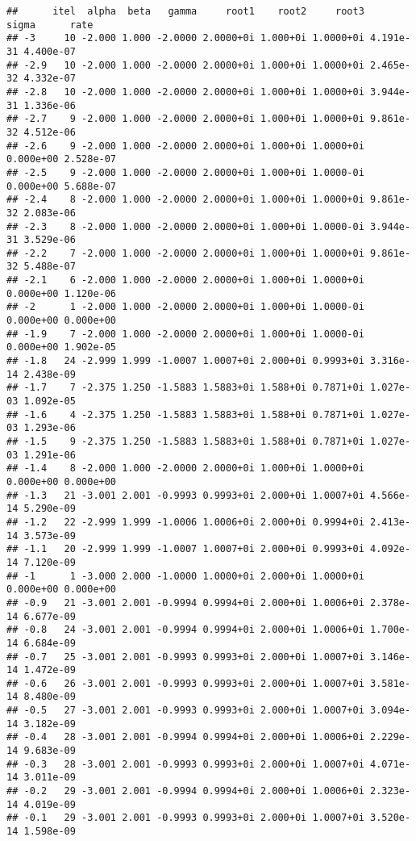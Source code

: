 \documentclass[
  12pt,
]{article}
\begin{document}
\begin{verbatim}
##      itel  alpha  beta   gamma     root1    root2     root3     sigma      rate
## -3     10 -2.000 1.000 -2.0000 2.0000+0i 1.000+0i 1.0000+0i 4.191e-31 4.400e-07
## -2.9   10 -2.000 1.000 -2.0000 2.0000+0i 1.000+0i 1.0000+0i 2.465e-32 4.332e-07
## -2.8   10 -2.000 1.000 -2.0000 2.0000+0i 1.000+0i 1.0000+0i 3.944e-31 1.336e-06
## -2.7    9 -2.000 1.000 -2.0000 2.0000+0i 1.000+0i 1.0000+0i 9.861e-32 4.512e-06
## -2.6    9 -2.000 1.000 -2.0000 2.0000+0i 1.000+0i 1.0000+0i 0.000e+00 2.528e-07
## -2.5    9 -2.000 1.000 -2.0000 2.0000+0i 1.000+0i 1.0000-0i 0.000e+00 5.688e-07
## -2.4    8 -2.000 1.000 -2.0000 2.0000+0i 1.000+0i 1.0000+0i 9.861e-32 2.083e-06
## -2.3    8 -2.000 1.000 -2.0000 2.0000+0i 1.000+0i 1.0000-0i 3.944e-31 3.529e-06
## -2.2    7 -2.000 1.000 -2.0000 2.0000+0i 1.000+0i 1.0000+0i 9.861e-32 5.488e-07
## -2.1    6 -2.000 1.000 -2.0000 2.0000+0i 1.000+0i 1.0000+0i 0.000e+00 1.120e-06
## -2      1 -2.000 1.000 -2.0000 2.0000+0i 1.000+0i 1.0000-0i 0.000e+00 0.000e+00
## -1.9    7 -2.000 1.000 -2.0000 2.0000+0i 1.000+0i 1.0000-0i 0.000e+00 1.902e-05
## -1.8   24 -2.999 1.999 -1.0007 1.0007+0i 2.000+0i 0.9993+0i 3.316e-14 2.438e-09
## -1.7    7 -2.375 1.250 -1.5883 1.5883+0i 1.588+0i 0.7871+0i 1.027e-03 1.092e-05
## -1.6    4 -2.375 1.250 -1.5883 1.5883+0i 1.588+0i 0.7871+0i 1.027e-03 1.293e-06
## -1.5    9 -2.375 1.250 -1.5883 1.5883+0i 1.588+0i 0.7871+0i 1.027e-03 1.291e-06
## -1.4    8 -2.000 1.000 -2.0000 2.0000+0i 1.000+0i 1.0000+0i 0.000e+00 0.000e+00
## -1.3   21 -3.001 2.001 -0.9993 0.9993+0i 2.000+0i 1.0007+0i 4.566e-14 5.290e-09
## -1.2   22 -2.999 1.999 -1.0006 1.0006+0i 2.000+0i 0.9994+0i 2.413e-14 3.573e-09
## -1.1   20 -2.999 1.999 -1.0007 1.0007+0i 2.000+0i 0.9993+0i 4.092e-14 7.120e-09
## -1      1 -3.000 2.000 -1.0000 1.0000+0i 2.000+0i 1.0000+0i 0.000e+00 0.000e+00
## -0.9   21 -3.001 2.001 -0.9994 0.9994+0i 2.000+0i 1.0006+0i 2.378e-14 6.677e-09
## -0.8   24 -3.001 2.001 -0.9994 0.9994+0i 2.000+0i 1.0006+0i 1.700e-14 6.684e-09
## -0.7   25 -3.001 2.001 -0.9993 0.9993+0i 2.000+0i 1.0007+0i 3.146e-14 1.472e-09
## -0.6   26 -3.001 2.001 -0.9993 0.9993+0i 2.000+0i 1.0007+0i 3.581e-14 8.480e-09
## -0.5   27 -3.001 2.001 -0.9993 0.9993+0i 2.000+0i 1.0007+0i 3.094e-14 3.182e-09
## -0.4   28 -3.001 2.001 -0.9994 0.9994+0i 2.000+0i 1.0006+0i 2.229e-14 9.683e-09
## -0.3   28 -3.001 2.001 -0.9993 0.9993+0i 2.000+0i 1.0007+0i 4.071e-14 3.011e-09
## -0.2   29 -3.001 2.001 -0.9994 0.9994+0i 2.000+0i 1.0006+0i 2.323e-14 4.019e-09
## -0.1   29 -3.001 2.001 -0.9993 0.9993+0i 2.000+0i 1.0007+0i 3.520e-14 1.598e-09

\end{verbatim}
\end{document}
